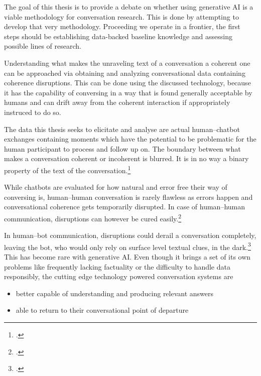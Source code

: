 \documentclass[12pt]{report}
\begin{document}
\par
The goal of this thesis is to provide a debate on whether
using generative AI is a viable methodology for conversation research.
This is done by attempting to develop that very methodology.
Proceeding we operate in a frontier,
the first steps should be establishing data-backed baseline knowledge
and assessing possible lines of research.

\par
Understanding what makes
the unraveling text of a conversation a coherent one
can be approached via obtaining and analyzing
conversational data containing coherence disruptions.
This can be done using the discussed technology,
because it has the capability of conversing in a way
that is found generally acceptable by humans
and can drift away from the coherent interaction
if appropriately instruced to do so.

\par
The data this thesis seeks to elicitate and analyse are
actual human–chatbot exchanges containing moments which
have the potential to be problematic for
the human participant to process and follow up on.
The boundary between what makes a conversation coherent or incoherent is blurred.
It is in no way a binary property of the text of the conversation.\footcite{givón2020coherence}

\par
While chatbots are evaluated for how natural and error free their way of conversing is,
human–human conversation is rarely flawless as
errors happen and
conversational coherence gets temporarily disrupted.
In case of human–human communication, disruptions can however be cured easily.\footcite{bublitz1999disturbed, DINGEMANSE202430}

\par
In human–bot communication, disruptions could derail a conversation completely,
leaving the bot, who would only rely on surface level textual clues, in the dark.\footcite{mctear2020conversational}
This has become rare with generative AI.
Even though it brings a set of its own problems like
frequently lacking factuality or
the difficulty to handle data responsibly,
the cutting edge technology powered conversation systems are

\begin{itemize}
\item
   better capable of understanding and producing relevant answers

\item
   able to return to their conversational point of departure
\end{itemize}
\end{document}
